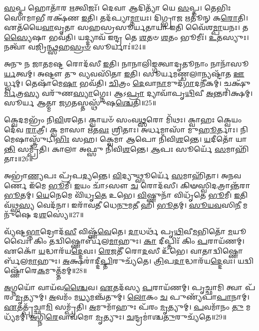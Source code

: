 \-\ul{𑌸}\-𑌪𑍍𑌤 𑌹𑍋𑌤𑌾᳴𑌰 \ul{𑌋}\-𑌤𑍍𑌵𑌿𑌜𑌃᳴। 𑌦𑍇𑌵𑌾 𑌆𑌦𑌿𑌤𑍍𑌯𑌾᳴ 𑌯𑍇 \ul{𑌸}\-𑌪𑍍𑌤। 
𑌤𑍇𑌭𑌿𑌃 𑌸𑍋𑌮𑌾𑌭𑍀 𑌰𑌕𑍍𑌷᳴𑌣 \ul{𑌇}\-𑌤𑌿। 𑌤𑌦᳴𑌪𑍍𑌯𑌾\-\ul{𑌮𑍍𑌨𑌾}\-𑌯𑌃। 
𑌦𑌿𑌗𑍍𑌭𑍍𑌰𑌾𑌜 𑌋𑌤𑍂॑𑌨𑍍‌ 𑌕\-\ul{𑌰𑍋}\-𑌤𑌿। 𑌏𑌤᳴𑌯𑍈\-\ul{𑌵𑌾}\-𑌵𑍃𑌤𑌾 𑌸𑌹𑌸𑍍𑌰𑌸𑍂𑌰𑍍𑌯𑌤𑌾𑌯𑌾 𑌇𑌤𑌿 𑌵𑍈᳴𑌶\-\ul{𑌮𑍍𑌪𑌾}\-𑌯𑌨𑌃। 
𑌤\-\ul{𑌸𑍍𑌯𑍈}\-𑌷𑌾 𑌭𑌵᳴𑌤𑌿। 𑌯𑌦𑍍𑌦𑍍𑌯𑌾𑌵᳴ 𑌇𑌨𑍍𑌦𑍍𑌰 𑌤𑍇 \ul{𑌶}\-𑌤𑍞 \ul{𑌶}\-𑌤𑌂 𑌭𑍂𑌮𑍀𑌃॑। 
\-\ul{𑌉}\-𑌤𑌸𑍍𑌯𑍁𑌃। 𑌨𑌤𑍍𑌵𑌾᳴ 𑌵𑌜𑍍𑌰𑌿\-\ul{𑌨𑍍𑌥𑍍𑌸}\-𑌹\-\ul{𑌸𑍍𑌰}\-\-\ul{𑍞} 𑌸𑍂𑌰𑍍𑌯𑌾𑌃॑॥24॥

𑌅𑌨𑍁 𑌨 𑌜𑌾𑌤𑌮𑌷𑍍𑌟 𑌰𑍋𑌦᳴𑌸𑍀 \ul{𑌇}\-𑌤𑌿। 𑌨𑌾𑌨𑌾𑌲𑌿𑌙𑍍𑌗𑌤𑍍𑌵𑌾𑌦𑍃𑌤𑍂𑌨𑌾𑌂 𑌨𑌾𑌨𑌾᳴𑌸𑍂\-\ul{𑌰𑍍𑌯}\-𑌤𑍍𑌵𑌮𑍍। 
𑌅𑌷𑍍𑌟𑍗 𑌤𑍁 𑌵𑍍𑌯𑌵𑌸𑌿᳴𑌤𑌾 \ul{𑌇}\-𑌤𑌿। 𑌸𑍂𑌰𑍍𑌯𑌮𑌣𑍍𑌡𑌲𑌾𑌨𑍍𑌯𑌷𑍍𑌟𑌾᳴𑌤 \ul{𑌊}\-𑌰𑍍𑌧𑍍𑌵𑌮𑍍। 
𑌤𑍇𑌷𑌾᳴𑌮𑍇\-\ul{𑌷𑌾} 𑌭𑌵᳴𑌤𑌿। \ul{𑌚𑌿}\-𑌤𑍍𑌰𑌂 \ul{𑌦𑍇}\-𑌵𑌾\-\ul{𑌨𑌾}\-𑌮𑍁𑌦᳴\-\ul{𑌗𑌾}\-𑌦𑌨𑍀᳴𑌕𑌮𑍍। 
𑌚𑌕𑍍𑌷𑍁᳴\-\ul{𑌰𑍍𑌮𑌿}\-𑌤𑍍𑌰\-\ul{𑌸𑍍𑌯} 𑌵𑌰𑍁᳴𑌣\-\ul{𑌸𑍍𑌯𑌾}\-𑌗𑍍𑌨𑍇𑌃। 𑌆𑌽\-\ul{𑌪𑍍𑌰𑌾} 𑌦𑍍𑌯𑌾𑌵𑌾᳴𑌪𑍃\-\ul{𑌥𑌿}\-𑌵𑍀 \ul{𑌅}\-𑌨𑍍𑌤𑌰𑌿᳴𑌕𑍍𑌷𑌮𑍍। 
𑌸𑍂𑌰𑍍𑌯 𑌆𑌤𑍍𑌮𑌾 𑌜𑌗𑌤𑌸𑍍𑌤𑌸𑍍𑌥𑍁᳴𑌷\-\ul{𑌶𑍍𑌚𑍇}\-𑌤𑌿॥25॥\anuvakamend


𑌕𑍍𑌵𑍇𑌦𑌮𑌭𑍍𑌰𑌂᳴ 𑌨𑌿\-\ul{𑌵𑌿}\-𑌶𑌤𑍇। 𑌕𑍍𑌵𑌾𑌯𑍞᳴ 𑌸𑌂𑌵\-\ul{𑌥𑍍𑌸}\-𑌰𑍋 𑌮𑌿᳴𑌥𑌃। 
𑌕𑍍𑌵𑌾𑌹𑌃 𑌕𑍍𑌵𑍇𑌯𑌂 𑌦𑍇᳴𑌵 \ul{𑌰𑌾}\-𑌤𑍍𑌰𑍀। 𑌕𑍍𑌵 𑌮𑌾𑌸𑌾 𑌋᳴𑌤\-\ul{𑌵𑌃} 𑌶𑍍𑌰𑌿𑌤𑌾𑌃। 
𑌅𑌰𑍍𑌧𑌮𑌾𑌸𑌾᳴ 𑌮𑍁\-\ul{𑌹𑍂}\-𑌰𑍍𑌤𑌾𑌃। 𑌨𑌿𑌮𑍇𑌷𑌾𑌸𑍍𑌤𑍍𑌰𑍁᳴𑌟𑌿\-\ul{𑌭𑌿𑌃} 𑌸𑌹। 
𑌕𑍍𑌵𑍇𑌮𑌾 𑌆𑌪𑍋 𑌨𑌿᳴𑌵𑌿\-\ul{𑌶}\-𑌨𑍍𑌤𑍇। \ul{𑌯}\-𑌦𑍀𑌤𑍋᳴ 𑌯𑌾\-\ul{𑌨𑍍𑌤𑌿} 𑌸𑌮𑍍𑌪𑍍𑌰᳴𑌤𑌿। 
𑌕𑌾𑌲𑌾 𑌅𑌫𑍍𑌸𑍁 𑌨𑌿᳴𑌵𑌿\-\ul{𑌶}\-𑌨𑍍𑌤𑍇। \ul{𑌆}\-𑌪𑌃 𑌸𑍂𑌰𑍍𑌯𑍇᳴ \ul{𑌸}\-𑌮𑌾𑌹𑌿᳴𑌤𑌾𑌃॥26॥

𑌅𑌭𑍍𑌰𑌾॑\-\ul{𑌣𑍍𑌯}\-𑌪𑌃 𑌪𑍍𑌰᳴𑌪\-\ul{𑌦𑍍𑌯}\-𑌨𑍍𑌤𑍇। \ul{𑌵𑌿}\-𑌦𑍍𑌯𑍁𑌥𑍍𑌸𑍂𑌰𑍍𑌯𑍇᳴ \ul{𑌸}\-𑌮𑌾𑌹𑌿᳴𑌤𑌾। 
𑌅𑌨𑌵𑌰𑍍𑌣𑍇 𑌇᳴𑌮𑍇 \ul{𑌭𑍂}\-𑌮𑍀। \ul{𑌇}\-𑌯𑌂 𑌚𑌾᳴𑌽𑌸𑍗 \ul{𑌚} 𑌰𑍋𑌦᳴𑌸𑍀। 
𑌕𑌿𑍟𑌸𑍍𑌵𑌿𑌦𑌤𑍍𑌰𑌾𑌨𑍍𑌤᳴𑌰𑌾 \ul{𑌭𑍂}\-𑌤𑌮𑍍। \ul{𑌯𑍇}\-𑌨𑍇𑌮𑍇 𑌵𑌿᳴𑌧𑍃\-\ul{𑌤𑍇} 𑌉𑌭𑍇। 
\-\ul{𑌵𑌿}\-𑌷𑍍𑌣𑍁𑌨𑌾᳴ 𑌵𑌿𑌧𑍃᳴𑌤𑍇 \ul{𑌭𑍂}\-𑌮𑍀। \ul{𑌇}\-𑌤𑌿 𑌵᳴𑌥𑍍𑌸\-\ul{𑌸𑍍𑌯} 𑌵𑍇𑌦᳴𑌨𑌾। 
𑌇𑌰𑌾᳴𑌵𑌤𑍀 𑌧𑍇\-\ul{𑌨𑍁}\-𑌮\-\ul{𑌤𑍀} 𑌹𑌿 \ul{𑌭𑍂}\-𑌤𑌮𑍍। \ul{𑌸𑍂}\-\-\ul{𑌯}\-\-\ul{𑌵}\-𑌸𑌿\-\ul{𑌨𑍀} 𑌮𑌨𑍁᳴𑌷𑍇 𑌦\-\ul{𑌶}\-𑌸𑍍𑌯𑍇॑॥27॥

𑌵𑍍𑌯᳴𑌷𑍍𑌟\-\ul{𑌭𑍍𑌨𑌾}\-𑌦𑍍𑌰𑍋𑌦᳴\-\ul{𑌸𑍀} 𑌵𑌿𑌷𑍍𑌣᳴\-\ul{𑌵𑍇}\-𑌤𑍇। \ul{𑌦𑌾}\-𑌧𑌰𑍍𑌥᳴ 𑌪𑍃\-\ul{𑌥𑌿}\-𑌵𑍀\-\ul{𑌮}\-𑌭𑌿𑌤𑍋᳴ \ul{𑌮}\-𑌯𑍂𑌖𑍈𑌃॑। 
𑌕𑌿𑌂 𑌤𑌦𑍍𑌵𑌿𑌷𑍍𑌣𑍋𑌰𑍍𑌬᳴𑌲\-\-\ul{𑌮𑌾}\-𑌹𑍁𑌃। \ul{𑌕𑌾} 𑌦𑍀𑌪𑍍𑌤𑌿𑌃᳴ 𑌕𑌿𑌂 \ul{𑌪}\-𑌰𑌾𑌯᳴𑌣𑌮𑍍। 
𑌏𑌕𑍋᳴ \ul{𑌯}\-𑌦𑍍𑌧𑌾𑌰᳴𑌯\-\ul{𑌦𑍍𑌦𑍇}\-𑌵𑌃। \ul{𑌰𑍇}\-𑌜𑌤𑍀᳴ 𑌰𑍋\-\ul{𑌦}\-𑌸𑍀 𑌉᳴𑌭𑍇। 
𑌵𑌾𑌤𑌾𑌦𑍍𑌵𑌿𑌷𑍍𑌣𑍋𑌰𑍍𑌬᳴𑌲\-\ul{𑌮𑌾}\-𑌹𑍁𑌃। \ul{𑌅}\-𑌕𑍍𑌷𑌰𑌾॑𑌦𑍍𑌦𑍀\-\ul{𑌪𑍍𑌤𑌿}\-𑌰𑍁𑌚𑍍𑌯᳴𑌤𑍇। 
\-\ul{𑌤𑍍𑌰𑌿}\-𑌪\-\ul{𑌦𑌾}\-𑌦𑍍𑌧𑌾𑌰᳴𑌯\-\ul{𑌦𑍍𑌦𑍇}\-𑌵𑌃। 𑌯𑌦𑍍𑌵𑌿𑌷𑍍𑌣𑍋᳴𑌰𑍇\-\ul{𑌕}\-𑌮𑍁𑌤𑍍𑌤᳴𑌮𑌮𑍍॥28॥

\-\ul{𑌅}\-𑌗𑍍𑌨𑌯𑍋᳴ 𑌵𑌾𑌯᳴𑌵\-\ul{𑌶𑍍𑌚𑍈}\-𑌵। \ul{𑌏}\-𑌤𑌦᳴𑌸𑍍𑌯 \ul{𑌪}\-𑌰𑌾𑌯᳴𑌣𑌮𑍍। 
𑌪𑍃𑌚𑍍𑌛𑌾𑌮𑌿 𑌤𑍍𑌵𑌾 𑌪᳴𑌰𑌂 \ul{𑌮𑍃}\-𑌤𑍍𑌯𑍁𑌮𑍍। \ul{𑌅}\-𑌵𑌮𑌂᳴ 𑌮\-\ul{𑌧𑍍𑌯}\-𑌮𑌞𑍍𑌚᳴𑌤𑍁𑌮𑍍। 
\-\ul{𑌲𑍋}\-𑌕𑌂 \ul{𑌚} 𑌪𑍁𑌣𑍍𑌯᳴𑌪𑌾\-\ul{𑌪𑌾}\-𑌨𑌾𑌮𑍍। \ul{𑌏}\-𑌤𑌤𑍍𑌪𑍃᳴𑌚𑍍𑌛𑌾\-\ul{𑌮𑌿} 𑌸𑌮𑍍𑌪𑍍𑌰᳴𑌤𑌿। 
\-\ul{𑌅}\-𑌮𑍁𑌮𑌾᳴𑌹𑍁𑌃 𑌪᳴𑌰𑌂 \ul{𑌮𑍃}\-𑌤𑍍𑌯𑍁𑌮𑍍। \ul{𑌪}\-𑌵𑌮𑌾᳴𑌨𑌂 \ul{𑌤𑍁} 𑌮𑌧𑍍𑌯᳴𑌮𑌮𑍍। 
\-\ul{𑌅}\-𑌗𑍍𑌨𑌿\-\ul{𑌰𑍇}\-𑌵𑌾𑌵᳴𑌮𑍋 \ul{𑌮𑍃}\-𑌤𑍍𑌯𑍁𑌃। \ul{𑌚}\-𑌨𑍍𑌦𑍍𑌰𑌮𑌾॑𑌶𑍍𑌚\-\ul{𑌤𑍁}\-𑌰𑍁𑌚𑍍𑌯᳴𑌤𑍇॥29॥

